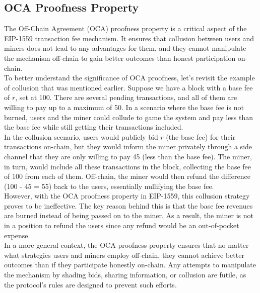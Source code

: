\subsection{OCA Proofness Property}
The Off-Chain Agreement (OCA) proofness property is a critical aspect of the EIP-1559 transaction fee mechanism. It ensures that collusion between users and miners does not lead to any advantages for them, and they cannot manipulate the mechanism off-chain to gain better outcomes than honest participation on-chain.\\

To better understand the significance of OCA proofness, let's revisit the example of collusion that was mentioned earlier. Suppose we have a block with a base fee of $r$, set at 100. There are several pending transactions, and all of them are willing to pay up to a maximum of 50. In a scenario where the base fee is not burned, users and the miner could collude to game the system and pay less than the base fee while still getting their transactions included.\\

In the collusion scenario, users would publicly bid $r$ (the base fee) for their transactions on-chain, but they would inform the miner privately through a side channel that they are only willing to pay 45 (less than the base fee). The miner, in turn, would include all these transactions in the block, collecting the base fee of 100 from each of them. Off-chain, the miner would then refund the difference (100 - 45 = 55) back to the users, essentially nullifying the base fee.\\

However, with the OCA proofness property in EIP-1559, this collusion strategy proves to be ineffective. The key reason behind this is that the base fee revenues are burned instead of being passed on to the miner. As a result, the miner is not in a position to refund the users since any refund would be an out-of-pocket expense.\\

In a more general context, the OCA proofness property ensures that no matter what strategies users and miners employ off-chain, they cannot achieve better outcomes than if they participate honestly on-chain. Any attempts to manipulate the mechanism by shading bids, sharing information, or collusion are futile, as the protocol's rules are designed to prevent such efforts.\\

